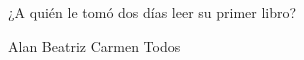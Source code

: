 ¿A quién le tom\'o dos d\'ias leer su primer libro?

\begin{oneparchoices}\footnotesize
    \choice Alan
    \choice Beatriz
    \CorrectChoice Carmen
    \choice Todos
\end{oneparchoices}